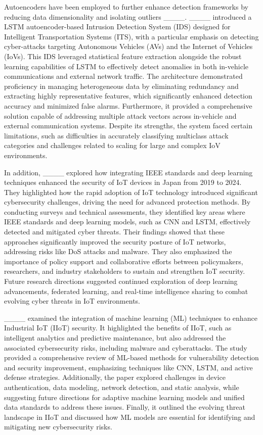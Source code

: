Autoencoders have been employed to further enhance detection frameworks by reducing data dimensionality and isolating outliers ____. ____ introduced a LSTM autoencoder-based Intrusion Detection System (IDS) designed for Intelligent Transportation Systems (ITS), with a particular emphasis on detecting cyber-attacks targeting Autonomous Vehicles (AVs) and the Internet of Vehicles (IoVs). This IDS leveraged statistical feature extraction alongside the robust learning capabilities of LSTM to effectively detect anomalies in both in-vehicle communications and external network traffic. The architecture demonstrated proficiency in managing heterogeneous data by eliminating redundancy and extracting highly representative features, which significantly enhanced detection accuracy and minimized false alarms. Furthermore, it provided a comprehensive solution capable of addressing multiple attack vectors across in-vehicle and external communication systems. Despite its strengths, the system faced certain limitations, such as difficulties in accurately classifying multiclass attack categories and challenges related to scaling for large and complex IoV environments.

In addition, ____ explored how integrating IEEE standards and deep learning techniques enhanced the security of IoT devices in Japan from 2019 to 2024. They highlighted how the rapid adoption of IoT technology introduced significant cybersecurity challenges, driving the need for advanced protection methods. By conducting surveys and technical assessments, they identified key areas where IEEE standards and deep learning models, such as CNN and LSTM, effectively detected and mitigated cyber threats. Their findings showed that these approaches significantly improved the security posture of IoT networks, addressing risks like DoS attacks and malware. They also emphasized the importance of policy support and collaborative efforts between policymakers, researchers, and industry stakeholders to sustain and strengthen IoT security. Future research directions suggested continued exploration of deep learning advancements, federated learning, and real-time intelligence sharing to combat evolving cyber threats in IoT environments.

____ examined the integration of machine learning (ML) techniques to enhance Industrial IoT (IIoT) security. It highlighted the benefits of IIoT, such as intelligent analytics and predictive maintenance, but also addressed the associated cybersecurity risks, including malware and cyberattacks. The study provided a comprehensive review of ML-based methods for vulnerability detection and security improvement, emphasizing techniques like CNN, LSTM, and active defense strategies. Additionally, the paper explored challenges in device authentication, data modeling, network detection, and static analysis, while suggesting future directions for adaptive machine learning models and unified data standards to address these issues. Finally, it outlined the evolving threat landscape in IIoT and discussed how ML models are essential for identifying and mitigating new cybersecurity risks.

